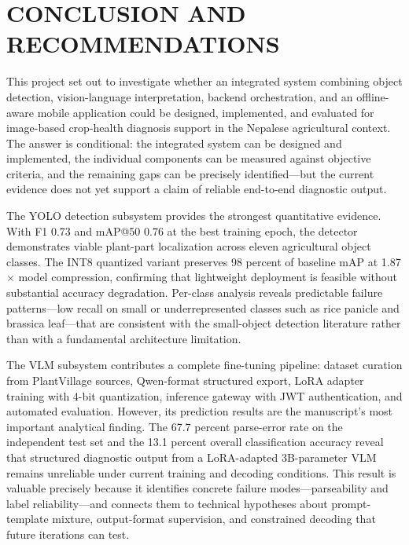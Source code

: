 \chapter{CONCLUSION AND RECOMMENDATIONS}


This project set out to investigate whether an integrated system combining object detection,
vision-language interpretation, backend orchestration, and an offline-aware mobile application
could be designed, implemented, and evaluated for image-based crop-health diagnosis support in
the Nepalese agricultural context. The answer is conditional: the integrated system can be
designed and implemented, the individual components can be measured against objective criteria,
and the remaining gaps can be precisely identified---but the current evidence does not yet
support a claim of reliable end-to-end diagnostic output.

The YOLO detection subsystem provides the strongest quantitative evidence. With F1 0.73 and
mAP@50 0.76 at the best training epoch, the detector demonstrates viable plant-part localization
across eleven agricultural object classes. The INT8 quantized variant preserves 98 percent of
baseline mAP at 1.87$\times$ model compression, confirming that lightweight deployment is
feasible without substantial accuracy degradation. Per-class analysis reveals predictable
failure patterns---low recall on small or underrepresented classes such as rice panicle and
brassica leaf---that are consistent with the small-object detection literature rather than with
a fundamental architecture limitation.

The VLM subsystem contributes a complete fine-tuning pipeline: dataset curation from
PlantVillage sources, Qwen-format structured export, LoRA adapter training with 4-bit
quantization, inference gateway with JWT authentication, and automated evaluation. However, its
prediction results are the manuscript's most important analytical finding. The 67.7 percent
parse-error rate on the independent test set and the 13.1 percent overall classification accuracy
reveal that structured diagnostic output from a LoRA-adapted 3B-parameter VLM remains unreliable
under current training and decoding conditions. This result is valuable precisely because it
identifies concrete failure modes---parseability and label reliability---and connects them to
technical hypotheses about prompt-template mixture, output-format supervision, and constrained
decoding that future iterations can test.

